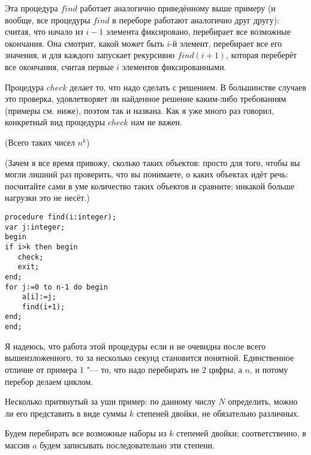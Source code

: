 Эта процедура $find$ работает аналогично приведённому выше примеру (и вообще, все 
процедуры $find$ в переборе работают аналогично друг другу): считая, что начало 
из $i-1$ элемента фиксировано, перебирает все возможные окончания. Она смотрит, 
какой может быть $i$-й элемент, перебирает все его значения, и для каждого 
запускает рекурсивно $find(i+1)$, которая переберёт все окончания, считая первые 
$i$ элементов фиксированными.

Процедура $check$ делает то, что надо сделать с решением. В большинстве случаев 
это проверка, удовлетворяет ли найденное решение каким-либо требованиям 
(примеры см. ниже), поэтом так и названа. Как я уже много раз говорил, 
конкретный вид процедуры $check$ нам не важен.

(Всего таких чисел $n^k$)\nopagebreak

(Зачем я все время привожу, сколько таких объектов: просто для того, чтобы вы 
могли лишний раз проверить, что вы понимаете, о каких объектах идёт речь: посчитайте сами в уме количество таких объектов и сравните; никакой больше нагрузки это не несёт.)

\begin{codesampleo}\begin{verbatim}
procedure find(i:integer);
var j:integer;
begin
if i>k then begin
   check;
   exit;
end;
for j:=0 to n-1 do begin
    a[i]:=j;
    find(i+1);
end;
end;
\end{verbatim}\end{codesampleo}

Я надеюсь, что работа этой процедуры если и не очевидна после всего 
вышеизложенного, то за несколько секунд становится понятной. Единственное 
отличие от примера 1 "--- то, что надо перебирать не $2$ цифры, а $n$, и потому 
перебор делаем циклом.

Несколько притянутый за уши пример: по данному числу $N$ определить, можно ли его 
представить в виде суммы $k$ степеней двойки, не обязательно различных.


Будем перебирать все возможные наборы из $k$ степеней двойки; соответственно, в 
массив $a$ будем записывать последовательно эти степени.

